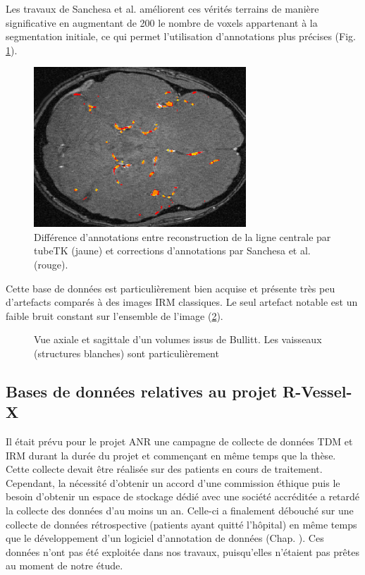 Les travaux de Sanchesa et al. \cite{Sanchesa2019_annotations_deep} améliorent ces vérités terrains de manière significative en augmentant de 200 \percent{} le nombre de voxels appartenant à la segmentation initiale, ce qui permet l'utilisation d'annotations plus précises (Fig.  \ref{fig:Bullitt_annotation_ameliorations}).

\begin{figure}
    \centering
    \includegraphics[height=6cm]{Images/Bullitt_annotation_ameliorations.png}
    \caption{Différence d'annotations entre reconstruction de la ligne centrale par tubeTK (jaune) et corrections d'annotations par Sanchesa et al. (rouge). }
    \label{fig:Bullitt_annotation_ameliorations}
\end{figure}

Cette base de données est particulièrement bien acquise et présente très peu d'artefacts comparés à des images IRM classiques. Le seul artefact notable est un faible bruit constant sur l'ensemble de l'image (\ref{fig:Bullitt_example}).

\begin{figure}
    \centering
    \caption{Vue axiale et sagittale d'un volumes issus de Bullitt. Les vaisseaux (structures blanches) sont particulièrement}
    \label{fig:Bullitt_example}
\end{figure}


\subsection{Bases de données relatives au projet R-Vessel-X}

Il était prévu pour le projet ANR une campagne de collecte de données TDM et IRM durant la durée du projet et commençant en même temps que la thèse. Cette collecte devait être réalisée sur des patients en cours de traitement. Cependant, la nécessité d'obtenir un accord d'une commission éthique puis le besoin d'obtenir un espace de stockage dédié avec une société accréditée a retardé la collecte des données d'au moins un an. Celle-ci a finalement débouché sur une collecte de données rétrospective (patients ayant quitté l'hôpital) en même temps que le développement d'un logiciel d'annotation de données (Chap. \chapReproN{}). Ces données n'ont pas été exploitée dans nos travaux, puisqu’elles n’étaient pas prêtes au moment de notre étude.


